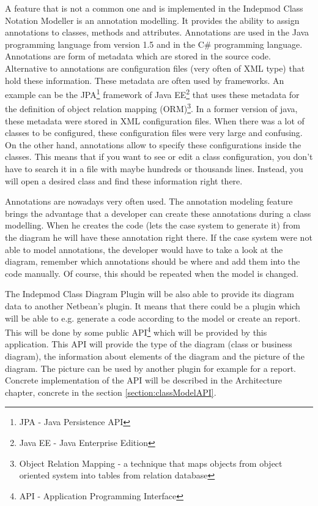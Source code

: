 A feature that is not a common one and is implemented in the Indepmod Class Notation Modeller is an annotation modelling. It provides the ability to assign annotations to classes, methods and attributes. Annotations are used in the Java programming language from version 1.5 and in the C\# programming language. Annotations are form of metadata which are stored in the source code. Alternative to annotations are configuration files (very often of XML type) that hold these information. These metadata are often used by frameworks. An example can be the JPA\footnote{JPA - Java Persistence API} framework of Java EE\footnote{Java EE - Java Enterprise Edition} that uses these metadata for the definition of object relation mapping (ORM)\footnote{Object Relation Mapping - a technique that maps objects from object oriented system into tables from relation database}. In a former version of java, these metadata were stored in XML configuration files. When there was a lot of classes to be configured, these configuration files were very large and confusing. On the other hand, annotations allow to specify these configurations inside the classes. This means that if you want to see or edit a class configuration, you don't have to search it in a file with maybe hundreds or thousands lines. Instead, you will open a desired class and find these information right there.

Annotations are nowadays very often used. The annotation modeling feature brings the advantage that a developer can create these annotations during a class modelling. When he creates the code (lets the case system to generate it) from the diagram he will have these annotation right there. If the case system were not able to model annotations, the developer would have to take a look at the diagram, remember which annotations should be where and add them into the code manually. Of course, this should be repeated when the model is changed.

The Indepmod Class Diagram Plugin will be also able to provide its diagram data to another Netbean's plugin. It means that there could be a plugin which will be able to e.g. generate a code according to the model or create an report. This will be done by some public API\footnote{API - Application Programming Interface} which will be provided by this application. This API will provide the type of the diagram (class or business diagram), the information about elements of the diagram and the picture of the diagram. The picture can be used by another plugin for example for a report. Concrete implementation of the API will be described in the Architecture chapter, concrete in the section \ref{section:classModelAPI}.

